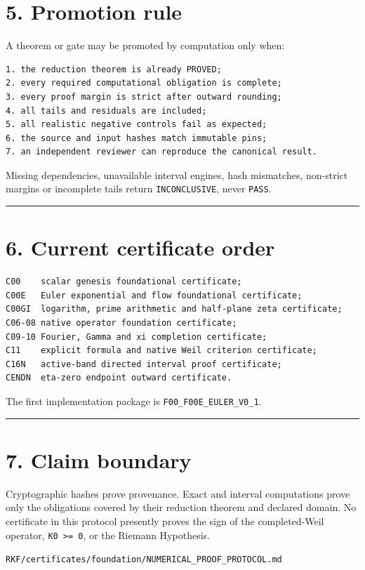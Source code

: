 \hypertarget{promotion-rule}{%
\section{5. Promotion rule}\label{promotion-rule}}

A theorem or gate may be promoted by computation only when:

\begin{verbatim}
1. the reduction theorem is already PROVED;
2. every required computational obligation is complete;
3. every proof margin is strict after outward rounding;
4. all tails and residuals are included;
5. all realistic negative controls fail as expected;
6. the source and input hashes match immutable pins;
7. an independent reviewer can reproduce the canonical result.
\end{verbatim}

Missing dependencies, unavailable interval engines, hash mismatches, non-strict
margins or incomplete tails return \texttt{INCONCLUSIVE}, never \texttt{PASS}.

\begin{center}\rule{0.5\linewidth}{0.5pt}\end{center}

\hypertarget{current-certificate-order}{%
\section{6. Current certificate order}\label{current-certificate-order}}

\begin{verbatim}
C00    scalar genesis foundational certificate;
C00E   Euler exponential and flow foundational certificate;
C00GI  logarithm, prime arithmetic and half-plane zeta certificate;
C06-08 native operator foundation certificate;
C09-10 Fourier, Gamma and xi completion certificate;
C11    explicit formula and native Weil criterion certificate;
C16N   active-band directed interval proof certificate;
CENDN  eta-zero endpoint outward certificate.
\end{verbatim}

The first implementation package is \texttt{F00\_F00E\_EULER\_V0\_1}.

\begin{center}\rule{0.5\linewidth}{0.5pt}\end{center}

\hypertarget{claim-boundary}{%
\section{7. Claim boundary}\label{claim-boundary}}

Cryptographic hashes prove provenance. Exact and interval computations prove only
the obligations covered by their reduction theorem and declared domain. No
certificate in this protocol presently proves the sign of the completed-Weil
operator, \texttt{K0\ \textgreater{}=\ 0}, or the Riemann Hypothesis.

\begin{flushright}\small\texttt{RKF/certificates/foundation/NUMERICAL\_PROOF\_PROTOCOL.md}\end{flushright}
